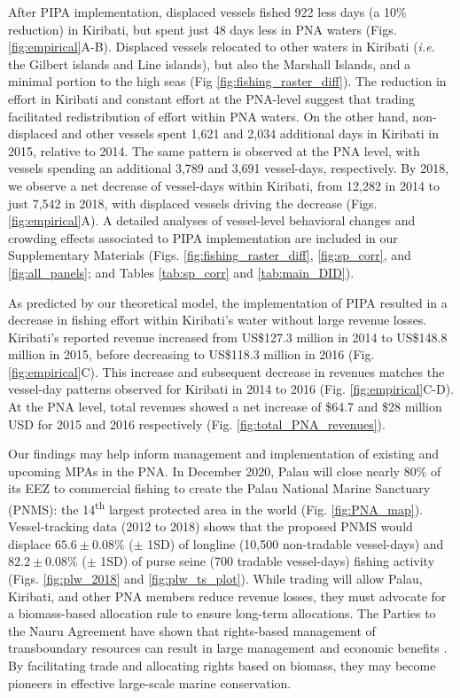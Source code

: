 \documentclass[12pt]{article}
\begin{document}
After PIPA implementation, displaced vessels fished 922 less days (a 10\% reduction) in Kiribati, but spent just 48 days less in PNA waters (Figs. \ref{fig:empirical}A-B). Displaced vessels relocated to other waters in Kiribati (\emph{i.e.} the Gilbert islands and Line islands), but also the Marshall Islands, and a minimal portion to the high seas (Fig \ref{fig:fishing_raster_diff}). The reduction in effort in Kiribati and constant effort at the PNA-level suggest that trading facilitated redistribution of effort within PNA waters. On the other hand, non-displaced and other vessels spent 1,621 and 2,034 additional days in Kiribati in 2015, relative to 2014. The same pattern is observed at the PNA level, with vessels spending an additional 3,789 and 3,691 vessel-days, respectively. By 2018, we observe a net decrease of vessel-days within Kiribati, from 12,282 in 2014 to just 7,542 in 2018, with displaced vessels driving the decrease (Figs. \ref{fig:empirical}A). A detailed analyses of vessel-level behavioral changes and crowding effects associated to PIPA implementation are included in our Supplementary Materials (Figs. \ref{fig:fishing_raster_diff}, \ref{fig:sp_corr}, and \ref{fig:all_panels}; and Tables \ref{tab:sp_corr} and \ref{tab:main_DID}).

As predicted by our theoretical model, the implementation of PIPA resulted in a decrease in fishing effort within Kiribati's water without large revenue losses. Kiribati's reported revenue increased from US\$127.3 million in 2014 to US\$148.8 million in 2015, before decreasing to US\$118.3 million in 2016 (Fig. \ref{fig:empirical}C). This increase and subsequent decrease in revenues matches the vessel-day patterns observed for Kiribati in 2014 to 2016 (Fig. \ref{fig:empirical}C-D). At the PNA level, total revenues showed a net increase of \$64.7 and \$28 million USD for 2015 and 2016 respectively (Fig. \ref{fig:total_PNA_revenues}).

Our findings may help inform management and implementation of existing and upcoming MPAs in the PNA. In December 2020, Palau will close nearly 80\% of its EEZ to commercial fishing to create the Palau National Marine Sanctuary (PNMS): the 14\textsuperscript{th} largest protected area in the world (Fig. \ref{fig:PNA_map}). Vessel-tracking data (2012 to 2018) shows that the proposed PNMS would displace $65.6 \pm 0.08$\% ($\pm$ 1SD) of longline (10,500 non-tradable vessel-days) and $82.2 \pm 0.08$\% ($\pm$ 1SD) of purse seine (700 tradable vessel-days) fishing activity (Figs. \ref{fig:plw_2018} and \ref{fig:plw_ts_plot}). While trading will allow Palau, Kiribati, and other PNA members reduce revenue losses, they must advocate for a biomass-based allocation rule to ensure long-term allocations. The Parties to the Nauru Agreement have shown that rights-based management of transboundary resources can result in large management and economic benefits \cite{havice_2013,aqorau_2018}. By facilitating trade and allocating rights based on biomass, they may become pioneers in effective large-scale marine conservation.
\end{document}
